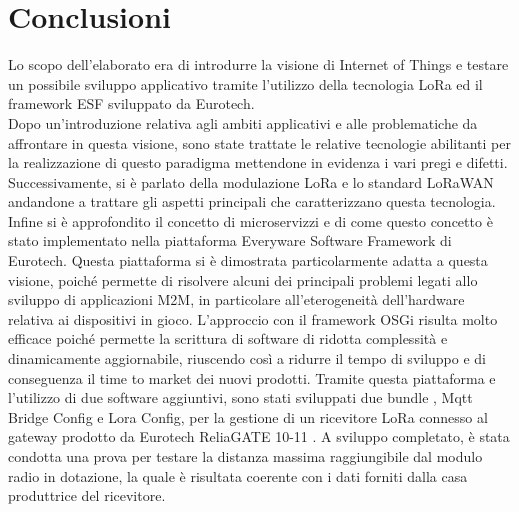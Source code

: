 \chapter{Conclusioni}
Lo scopo dell’elaborato era di introdurre la visione di Internet of Things e
testare un possibile sviluppo applicativo tramite l'utilizzo della tecnologia  
LoRa ed il framework ESF sviluppato da Eurotech.\\
Dopo un'introduzione relativa agli ambiti applicativi e alle problematiche da
affrontare in questa visione, sono state trattate le relative tecnologie
abilitanti per la realizzazione di  questo paradigma mettendone in evidenza i
vari pregi e difetti. 
Successivamente, si è parlato della modulazione LoRa e lo standard LoRaWAN
andandone a trattare gli aspetti principali che caratterizzano questa
tecnologia.
Infine si è approfondito il concetto di microservizzi e di come questo concetto
è stato implementato nella piattaforma Everyware Software Framework di Eurotech.
Questa piattaforma si è dimostrata
particolarmente adatta a questa visione, poiché permette di risolvere alcuni
dei principali problemi legati allo sviluppo di applicazioni M2M, in particolare all’eterogeneità
dell’hardware relativa ai dispositivi in gioco. 
L’approccio con il framework OSGi risulta molto efficace poiché permette la
scrittura di  software di  ridotta complessità e dinamicamente aggiornabile, 
riuscendo così a ridurre il tempo di sviluppo e di conseguenza il time to market
dei nuovi prodotti.
Tramite questa piattaforma e l'utilizzo di due software aggiuntivi, 
sono stati sviluppati due bundle , Mqtt Bridge Config e Lora Config,
per la gestione di un ricevitore LoRa connesso al gateway prodotto da Eurotech ReliaGATE 10-11 
. A sviluppo completato, è stata condotta una prova per testare la
distanza massima raggiungibile dal modulo radio in dotazione, la quale è
risultata coerente con i dati forniti dalla casa produttrice del ricevitore.
